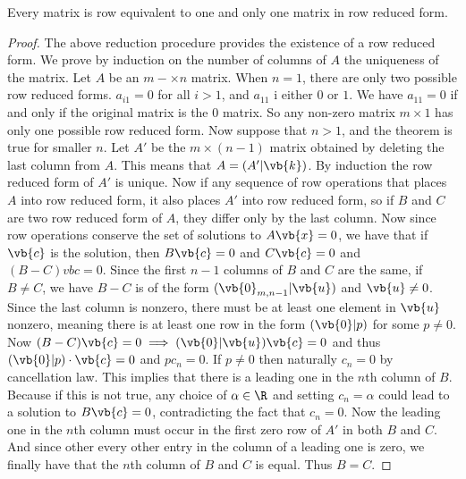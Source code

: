 \begin{thm}{}{} Every matrix is row equivalent to one and only one matrix in row reduced form. 
\end{thm}
\begin{proof} The above reduction procedure provides the existence of a row reduced form. We prove by induction on the number of columns of $A$ the uniqueness of the matrix. Let $A$ be an $m-\times n$ matrix. When $n=1$, there are only two possible row reduced forms. $a_{i1}=0$ for all $i>1$, and $a_{11}$ i either $0$ or $1$. We have $a_{11}=0$ if and only if the original matrix is the $0$ matrix. So any non-zero matrix $m\times 1$ has only one possible row reduced form. \linebreak\linebreak
Now suppose that $n>1$, and the theorem is true for smaller $n$. Let $A'$ be the $m\times(n-1)$ matrix obtained by deleting the last column from $A$. This means that $A=(A'|\vb{k})$. By induction the row reduced form of $A'$ is unique. Now if any sequence of row operations that places $A$ into row reduced form, it also places $A'$ into row reduced form, so if $B$ and $C$ are two row reduced form of $A$, they differ only by the last column. Now since row operations conserve the set of solutions to $A\vb{x}=0$, we have that if $\vb{c}$ is the solution, then $B\vb{c}=0$ and $C\vb{c}=0$ and $(B-C)vb{c}=0$. Since the first $n-1$ columns of $B$ and $C$ are the same, if $B\neq C$, we have $B-C$ is of the form $(\vb{0}_{m,n-1}|\vb{u})$ and $\vb{u}\neq0$. Since the last column is nonzero, there must be at least one element in $\vb{u}$ nonzero, meaning there is at least one row in the form $(\vb{0}|p)$ for some $p\neq0$. \linebreak\linebreak
Now $(B-C)\vb{c}=0\implies (\vb{0}|\vb{u})\vb{c}=0$ and thus $(\vb{0}|p)\cdot\vb{c}=0$ and $pc_n=0$. If $p\neq 0$ then naturally $c_n=0$ by cancellation law. This implies that there is a leading one in the $n$th column of $B$. Because if this is not true, any choice of $\alpha\in\R$ and setting $c_n=\alpha$ could lead to a solution to $B\vb{c}=0$, contradicting the fact that $c_n=0$. \linebreak\linebreak
Now the leading one in the $n$th column must occur in the first zero row of $A'$ in both $B$ and $C$. And since other every other entry in the column of a leading one is zero, we finally have that the $n$th column of $B$ and $C$ is equal. Thus $B=C$. 
\end{proof}

